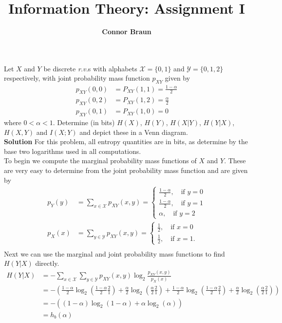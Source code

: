 \documentclass[11pt, letterpaper]{article}
\title{\bf Information Theory: Assignment I}
\author{\bf Connor Braun}
\date{}
\newcommand{\mc}[1]{\mathcal{#1}}
\begin{document}
\maketitle
{} Let $X$ and $Y$ be discrete {\it r.v.}s with alphabets $\mc{X}=\{0,1\}$ and $\mc{Y}=\{0,1,2\}$ respectively,
with joint probability mass function $p_{XY}$ given by
\begin{align*}
    p_{XY}(0,0)&=P_{XY}(1,1)=\frac{1-\alpha}{2}\\
    p_{XY}(0,2)&=P_{XY}(1,2)=\frac{\alpha}{2}\\
    p_{XY}(0,1)&=P_{XY}(1,0)=0
\end{align*}
where $0<\alpha<1$. Determine (in bits) $H(X)$, $H(Y)$, $H(X|Y)$, $H(Y|X)$, $H(X,Y)$ and $I(X;Y)$ and depict these in a
Venn diagram.\\[10pt]
{\bf Solution} For this problem, all entropy quantities are in bits, as determine by the base two logarithms used in all computations.\\[10pt]
To begin we compute the marginal probability mass functions of $X$ and $Y$. These are very easy to determine from the joint probability mass function
and are given by
\begin{align*}
    p_Y(y)&=\sum_{x\in\mc{X}}p_{XY}(x,y)=\begin{cases}
        \frac{1-\alpha}{2},\quad\text{if $y=0$}\\
        \frac{1-\alpha}{2},\quad\text{if $y=1$}\\
        \alpha,\quad\text{if $y=2$}
    \end{cases}\\
    p_X(x)&=\sum_{y\in\mc{Y}}p_{XY}(x,y)=\begin{cases}
        \frac{1}{2},\quad\text{if $x=0$}\\
        \frac{1}{2},\quad\text{if $x=1$}.
    \end{cases}\\
\end{align*} 
Next we can use the marginal and joint probability mass functions to find $H(Y|X)$ directly.
\begin{align*}
    H(Y|X)&=-\sum_{x\in\mc{X}}\sum_{y\in\mc{Y}}p_{XY}(x,y)\log_2\frac{p_{XY}(x,y)}{p_X(x)}\\
    &=-\left(\frac{1-\alpha}{2}\log_2\left(\frac{1-\alpha}{2}\frac{2}{1}\right)+\frac{\alpha}{2}\log_2\left(\frac{\alpha}{2}\frac{2}{1}\right)+\frac{1-\alpha}{2}\log_2\left(\frac{1-\alpha}{2}\frac{2}{1}\right)+\frac{\alpha}{2}\log_2\left(\frac{\alpha}{2}\frac{2}{1}\right)\right)\\
    &=-\left((1-\alpha)\log_2(1-\alpha)+\alpha\log_2(\alpha)\right)\\
    &=h_b(\alpha)
\end{align*}
\end{document}

